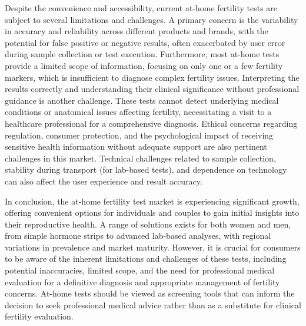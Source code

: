 \documentclass{article}
\begin{document}
Despite the convenience and accessibility, current at-home fertility tests are subject to several limitations and challenges. A primary concern is the variability in accuracy and reliability across different products and brands, with the potential for false positive or negative results, often exacerbated by user error during sample collection or test execution. Furthermore, most at-home tests provide a limited scope of information, focusing on only one or a few fertility markers, which is insufficient to diagnose complex fertility issues. Interpreting the results correctly and understanding their clinical significance without professional guidance is another challenge. These tests cannot detect underlying medical conditions or anatomical issues affecting fertility, necessitating a visit to a healthcare professional for a comprehensive diagnosis. Ethical concerns regarding regulation, consumer protection, and the psychological impact of receiving sensitive health information without adequate support are also pertinent challenges in this market. Technical challenges related to sample collection, stability during transport (for lab-based tests), and dependence on technology can also affect the user experience and result accuracy.

In conclusion, the at-home fertility test market is experiencing significant growth, offering convenient options for individuals and couples to gain initial insights into their reproductive health. A range of solutions exists for both women and men, from simple hormone strips to advanced lab-based analyses, with regional variations in prevalence and market maturity. However, it is crucial for consumers to be aware of the inherent limitations and challenges of these tests, including potential inaccuracies, limited scope, and the need for professional medical evaluation for a definitive diagnosis and appropriate management of fertility concerns. At-home tests should be viewed as screening tools that can inform the decision to seek professional medical advice rather than as a substitute for clinical fertility evaluation.
\end{document}
